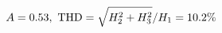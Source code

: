\documentclass[preview]{standalone}
\begin{document}
\begin{align*}
\special{dvisvgm:raw <g id='unique000'>}A=0.53,\ \text{THD}=\sqrt{H_2^2+H_3^2}/H_1=10.2\%\special{dvisvgm:raw </g>}
\end{align*}
\end{document}
